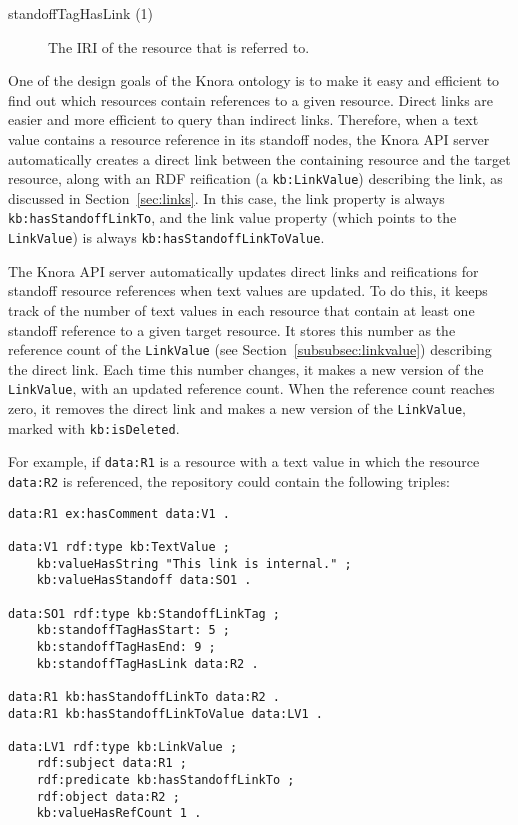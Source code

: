 \documentclass[12pt, a4paper]{article}
\begin{document}
\begin{description}
	\item[standoffTagHasLink (1)] The IRI of the resource that is referred to.
\end{description}

One of the design goals of the Knora ontology is to make it easy and efficient to find out which resources contain references to a given resource. Direct links are easier and more efficient to query than indirect links. Therefore, when a text value contains a resource reference in its standoff nodes, the Knora API server automatically creates a direct link between the containing resource and the target resource, along with an RDF reification (a \texttt{kb:LinkValue}) describing the link, as discussed in Section~\ref{sec:links}. In this case, the link property is always \texttt{kb:hasStandoffLinkTo}, and the link value property (which points to the \texttt{LinkValue}) is always \texttt{kb:hasStandoffLinkToValue}.

The Knora API server automatically updates direct links and reifications for standoff resource references when text values are updated. To do this, it keeps track of the number of text values in each resource that contain at least one standoff reference to a given target resource. It stores this number as the reference count of the \texttt{LinkValue} (see Section~\ref{subsubsec:linkvalue}) describing the direct link. Each time this number changes, it makes a new version of the \texttt{LinkValue}, with an updated reference count. When the reference count reaches zero, it removes the direct link and makes a new version of the \texttt{LinkValue}, marked with \texttt{kb:isDeleted}.

For example, if \texttt{data:R1} is a resource with a text value in which the resource \texttt{data:R2} is referenced, the repository could contain the following triples:

\begin{verbatim}
data:R1 ex:hasComment data:V1 .

data:V1 rdf:type kb:TextValue ;
    kb:valueHasString "This link is internal." ;
    kb:valueHasStandoff data:SO1 .

data:SO1 rdf:type kb:StandoffLinkTag ;
    kb:standoffTagHasStart: 5 ;
    kb:standoffTagHasEnd: 9 ;
    kb:standoffTagHasLink data:R2 .

data:R1 kb:hasStandoffLinkTo data:R2 .
data:R1 kb:hasStandoffLinkToValue data:LV1 . 

data:LV1 rdf:type kb:LinkValue ;
    rdf:subject data:R1 ;
    rdf:predicate kb:hasStandoffLinkTo ;
    rdf:object data:R2 ;
    kb:valueHasRefCount 1 .
\end{verbatim}
\end{document}
